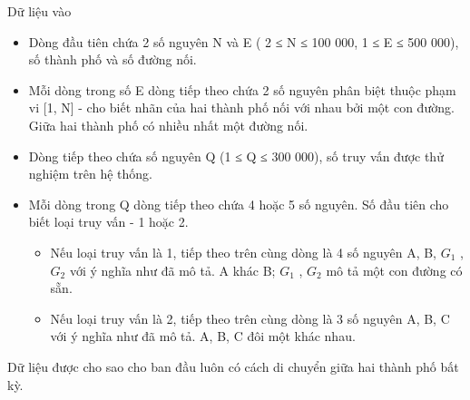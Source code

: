Dữ liệu vào
\begin{itemize}
	\item     Dòng đầu tiên chứa 2 số nguyên N và E ( 2 ≤ N ≤ 100 000, 1 ≤ E ≤ 500 000), số thành phố và số đường nối.   
	\item     Mỗi dòng trong số E dòng tiếp theo chứa 2 số nguyên phân biệt thuộc phạm vi [1, N] - cho biết nhãn của hai thành phố nối với nhau bởi một con đường. Giữa hai thành phố có nhiều nhất một đường nối.   
	\item     Dòng tiếp theo chứa số nguyên Q (1 ≤ Q ≤ 300 000), số truy vấn được thử nghiệm trên hệ thống.   
	\item     Mỗi dòng trong Q dòng tiếp theo chứa 4 hoặc 5 số nguyên. Số đầu tiên cho biết loại truy vấn - 1 hoặc 2.    
\begin{itemize}
	\item       Nếu loại truy vấn là 1, tiếp theo trên cùng dòng là 4 số nguyên A, B, $G_{1}$      , $G_{2}$      với ý nghĩa như đã mô tả. A khác B; $G_{1}$      , $G_{2}$      mô tả một con đường có   sẵn.     
	\item       Nếu loại truy vấn là 2, tiếp theo trên cùng dòng là 3 số nguyên A, B, C với ý nghĩa như đã mô tả. A, B, C đôi một khác nhau.     
\end{itemize}
\end{itemize}

   Dữ liệu được cho sao cho ban đầu luôn có cách di chuyển giữa hai thành phố bất kỳ.